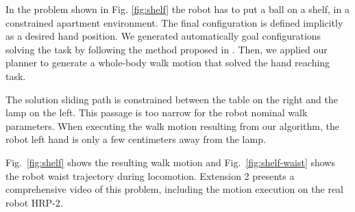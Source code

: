 \documentclass{article}
\begin{document}
In the problem shown in Fig. \ref{fig:shelf} the robot has to put a ball on a
shelf, in a constrained apartment environment. The final configuration is defined 
implicitly as a desired hand position. We generated automatically goal configurations 
solving the task by following the method proposed in \cite{dalibard09}. Then, we 
applied our planner to generate a whole-body walk motion that solved the hand reaching
task. 

The solution sliding path is constrained between the table on the right and the lamp
on the left. This passage is too narrow for the robot nominal walk parameters. 
When executing the walk motion resulting from our algorithm, the robot left hand
is only a few centimeters away from the lamp.

Fig.~\ref{fig:shelf} shows the resulting walk motion and Fig.~\ref{fig:shelf-waist} 
shows the robot waist trajectory during locomotion. Extension 2 presents a 
comprehensive video of this problem, including the motion execution on
the real robot HRP-2.
\end{document}
